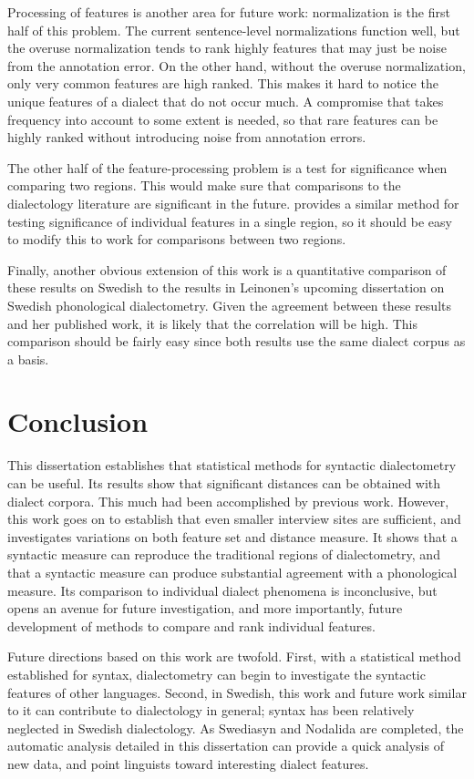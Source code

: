 Processing of features is another area for future work: normalization
is the first half of this problem. The current sentence-level
normalizations function well, but the overuse normalization tends to
rank highly features that may just be noise from the annotation
error. On the other hand, without the overuse normalization, only very
common features are high ranked. This makes it hard to notice the
unique features of a dialect that do not occur much. A compromise that
takes frequency into account to some extent is needed, so that rare
features can be highly ranked without introducing noise from
annotation errors.

The other half of the feature-processing problem is a test for
significance when comparing two regions. This would make sure that
comparisons to the dialectology literature are significant in the
future.  provides a similar method for testing
significance of individual features in a single region, so it should
be easy to modify this to work for comparisons between two regions.

Finally, another obvious extension of this work is a quantitative
comparison of these results on Swedish to the results in Leinonen's
upcoming dissertation on Swedish phonological dialectometry. Given the
agreement between these results and her published work, it is likely
that the correlation will be high. This comparison should be fairly
easy since both results use the same dialect corpus as a basis.

\section{Conclusion}

This dissertation establishes that statistical methods for syntactic
dialectometry can be useful. Its results show that significant
distances can be obtained with dialect corpora. This much had been
accomplished by previous work. However, this work goes on to establish
that even smaller interview sites are sufficient, and investigates variations
on both feature set and distance measure. It shows that a syntactic
measure can reproduce the traditional regions of dialectometry, and
that a syntactic measure can produce substantial agreement with a
phonological measure. Its comparison to individual dialect phenomena is
inconclusive, but opens an avenue for future investigation, and more
importantly, future development of methods to compare and rank
individual features.

Future directions based on this work are twofold. First, with a
statistical method established for syntax, dialectometry can begin to
investigate the syntactic features of other languages. Second, in
Swedish, this work and future work similar to it can contribute to
dialectology in general; syntax has been relatively neglected in
Swedish dialectology. As Swediasyn and Nodalida are completed, the
automatic analysis detailed in this dissertation can provide a quick
analysis of new data, and point linguists toward interesting dialect
features.

